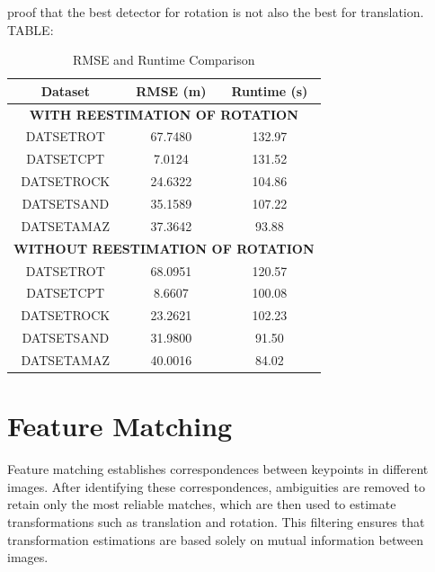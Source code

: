 proof that the best detector for rotation is not also the best for translation.
TABLE:
\begin{table}[H]
    \centering
    \caption{RMSE and Runtime Comparison}
    \label{tab:rot_reestimation}
    \begin{tabular}{|c|c|c|}
    \hline
    \textbf{Dataset} & \textbf{RMSE (m)} & \textbf{Runtime (s)} \\ \hline
    \multicolumn{3}{|c|}{\textbf{WITH REESTIMATION OF ROTATION}} \\ \hline
    DATSETROT       & 67.7480           & 132.97               \\ \hline
    DATSETCPT       & 7.0124            & 131.52               \\ \hline
    DATSETROCK      & 24.6322           & 104.86               \\ \hline
    DATSETSAND      & 35.1589           & 107.22               \\ \hline
    DATSETAMAZ      & 37.3642           & 93.88                \\ \hline
    \multicolumn{3}{|c|}{\textbf{WITHOUT REESTIMATION OF ROTATION}} \\ \hline
    DATSETROT       & 68.0951           & 120.57               \\ \hline
    DATSETCPT       & 8.6607            & 100.08               \\ \hline
    DATSETROCK      & 23.2621           & 102.23               \\ \hline
    DATSETSAND      & 31.9800           & 91.50                \\ \hline
    DATSETAMAZ      & 40.0016           & 84.02                \\ \hline
    \end{tabular}
    \end{table}
    


\section{Feature Matching}

Feature matching establishes correspondences between keypoints in different images. After identifying these correspondences, ambiguities are removed to retain only the most reliable matches, which are then used to estimate transformations such as translation and rotation. This filtering ensures that transformation estimations are based solely on mutual information between images.


